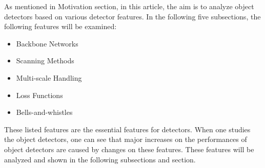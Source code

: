 \documentclass{article}
\begin{document}
\setlength{\parindent}{6ex}

\indent

As mentioned in Motivation section, in this article, the aim is to analyze 
object detectors based on various detector features. In the following five 
subsections, the following features will be examined:
\begin{itemize}
    \item Backbone Networks
    \item Scanning Methods
    \item Multi-scale Handling
    \item Loss Functions
    \item Bells-and-whistles
\end{itemize} 
\indent 

These listed features are the essential features for detectors. When one 
studies the object detectors, one can see that major increases on the 
performances of object detectors are caused by changes on these features. 
These features will be analyzed and shown in the following subsections and 
section.
\end{document}
